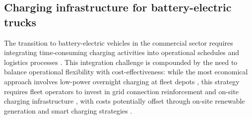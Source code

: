         \subsection{Charging infrastructure for battery-electric trucks}
        The transition to battery-electric vehicles in the commercial sector requires integrating time-consuming charging activities into operational schedules and logistics processes \cite{GILLSTROM2024100172}. This integration challenge is compounded by the need to balance operational flexibility with cost-effectiveness: while the most economical approach involves low-power overnight charging at fleet depots \cite{Borlaug2021}, this strategy requires fleet operators to invest in grid connection reinforcement and on-site charging infrastructure \cite{WANG2025107490}, with costs potentially offset through on-site renewable generation and smart charging strategies \citep{ALHANAHI2022100182,MIYABE2025117626}.
        

